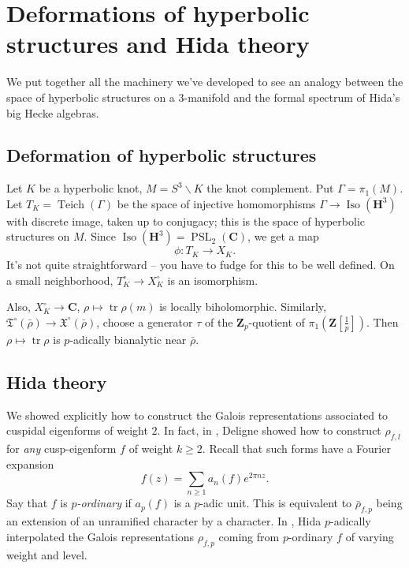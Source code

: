 \documentclass[oneside]{amsart}
\DeclareMathOperator{\isometry}{Iso}
\DeclareMathOperator{\PSL}{PSL}
\DeclareMathOperator{\trace}{tr}
\newcommand{\dC}{\mathbf{C}}
\newcommand{\dH}{\mathbf{H}}
\newcommand{\dZ}{\mathbf{Z}}
\newcommand{\fT}{\mathfrak{T}}
\newcommand{\fX}{\mathfrak{X}}
\begin{document}
\section{Deformations of hyperbolic structures and Hida theory}

We put together all the machinery we've developed to see an analogy between the 
space of hyperbolic structures on a 3-manifold and the formal spectrum of 
Hida's big Hecke algebras. 


\subsection{Deformation of hyperbolic structures}

Let $K$ be a hyperbolic knot, $M=S^3\smallsetminus K$ the knot complement. Put 
$\Gamma=\pi_1(M)$. Let $T_K=\operatorname{Teich}(\Gamma)$ be the space of 
injective homomorphisms $\Gamma\to \isometry(\dH^3)$ with discrete image, taken 
up to conjugacy; this is the space of hyperbolic structures on $M$. Since 
$\isometry(\dH^3)=\PSL_2(\dC)$, we get a map 
\[
  \phi:T_K \to X_K .
\]
It's not quite straightforward -- you have to fudge for this to be well defined. 
On a small neighborhood, $T_K^\circ \to X_K^\circ$ is an isomorphism. 

Also, $X_K^\circ\to \dC$, $\rho\mapsto \trace \rho(m)$ is locally 
biholomorphic. Similarly, $\fT^\circ(\bar\rho) \to \fX^\circ(\bar\rho)$, 
choose a generator $\tau$ of the $\dZ_p$-quotient of $\pi_1(\dZ[\frac 1 p])$. 
Then $\rho\mapsto \trace\rho$ is $p$-adically bianalytic near $\bar\rho$. 


\subsection{Hida theory}

We showed explicitly how to construct the Galois representations associated to 
cuspidal eigenforms of weight $2$. In fact, in \cite{deligne-1973}, Deligne 
showed how to construct $\rho_{f,l}$ for \emph{any} cusp-eigenform $f$ of 
weight $k\geqslant 2$. Recall that such forms have a Fourier expansion 
\[
  f(z) = \sum_{n\geqslant 1} a_n(f) e^{2\pi n z} .
\]
Say that $f$ is \emph{$p$-ordinary} if $a_p(f)$ is a $p$-adic unit. This is equivalent 
to $\bar\rho_{f,p}$ being an extension of an unramified character by a 
character. In \cite{hida-1986a,hida-1986b}, Hida $p$-adically interpolated the 
Galois representations $\rho_{f,p}$ coming from $p$-ordinary $f$ of varying 
weight and level. 
\end{document}
